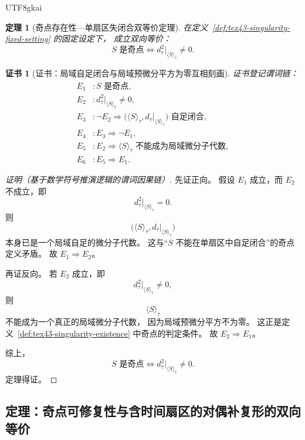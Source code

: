 \documentclass[12pt]{article}
\newtheorem{theorem}{定理}[section]
\newtheorem{Certificate}{证书}[section]
\begin{document}
\begin{CJK*}{UTF8}{gkai}
\begin{theorem}[奇点存在性—单扇区失闭合双等价定理]
\label{thm:tex43-singularity-existence-iff}
在定义~\ref{def:tex43-singularity-fixed-setting} 的固定设定下，
成立双向等价：
\[
  \boxed{
    S\text{ 是奇点}
    \iff
    d_{\bar\tau}^2\big|_{\langle S\rangle_{\bar\tau}}\neq 0.
  }
\]
\end{theorem}

\begin{Certificate}[证书：局域自足闭合与局域预微分平方为零互相刻画]
\label{cert:tex43-singularity-existence-iff}
证书登记谓词链：
\[
\begin{aligned}
  E_1 &: S\text{ 是奇点},\\
  E_2 &: d_{\bar\tau}^2\big|_{\langle S\rangle_{\bar\tau}}\neq 0,\\
  E_3 &: \neg E_2 \Rightarrow
         \big(\langle S\rangle_{\bar\tau},d_{\bar\tau}|_{\langle S\rangle_{\bar\tau}}\big)
         \text{ 自足闭合},\\
  E_4 &: E_3 \Rightarrow \neg E_1,\\
  E_5 &: E_2 \Rightarrow
         \langle S\rangle_{\bar\tau}\text{ 不能成为局域微分子代数},\\
  E_6 &: E_5 \Rightarrow E_1.
\end{aligned}
\]
\end{Certificate}

\begin{proof}[证明（基于数学符号推演逻辑的谓词因果链）]
先证正向。
假设 $E_1$ 成立，而 $E_2$ 不成立，即
\[
  d_{\bar\tau}^2\big|_{\langle S\rangle_{\bar\tau}}=0.
\]
则
\[
  \big(\langle S\rangle_{\bar\tau},d_{\bar\tau}|_{\langle S\rangle_{\bar\tau}}\big)
\]
本身已是一个局域自足的微分子代数。
这与“$S$ 不能在单扇区中自足闭合”的奇点定义矛盾。
故 $E_1\Rightarrow E_2$。

再证反向。
若 $E_2$ 成立，即
\[
  d_{\bar\tau}^2\big|_{\langle S\rangle_{\bar\tau}}\neq 0,
\]
则
\[
  \langle S\rangle_{\bar\tau}
\]
不能成为一个真正的局域微分子代数，
因为局域预微分平方不为零。
这正是定义~\ref{def:tex43-singularity-existence} 中奇点的判定条件。
故 $E_2\Rightarrow E_1$。

综上，
\[
  S\text{ 是奇点}
  \iff
  d_{\bar\tau}^2\big|_{\langle S\rangle_{\bar\tau}}\neq 0.
\]
定理得证。
\end{proof}

\subsection{定理：奇点可修复性与含时间扇区的对偶补复形的双向等价}
\label{subsec:tex43-ch8-theorem-repairability}


\end{CJK*}
\end{document}
